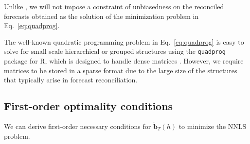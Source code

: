 \documentclass[twocolumn]{svjour3}
\begin{document}
Unlike \citet{Wick2018}, we will not impose a constraint of unbiasedness on the reconciled forecasts obtained as the solution of the minimization problem in Eq.~\eqref{eq:quadprog}.

The well-known quadratic programming problem in Eq.~\eqref{eq:quadprog} is easy to solve for small scale hierarchical or grouped structures using the \texttt{quadprog} package for R, which is designed to handle dense matrices \citep{quadprog2013}. However, we require matrices to be stored in a sparse format due to the large size of the structures that typically arise in forecast reconciliation.

\subsection{First-order optimality conditions}

We can derive first-order necessary conditions for $\breve{\bm{b}}_{T}(h)$ to minimize the NNLS problem.
\end{document}
